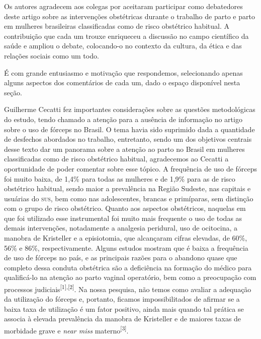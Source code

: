 \documentclass{article}
\begin{document}
Os autores agradecem aos colegas por aceitaram participar como debatedores deste
artigo
sobre as intervenções obstétricas durante o trabalho de parto e parto em
mulheres
brasileiras classificadas como de risco obstétrico habitual. A contribuição que
cada um
trouxe enriqueceu a discussão no campo científico da saúde e ampliou o debate,
colocando-o no contexto da cultura, da ética e das relações sociais como um
todo.

É com grande entusiasmo e motivação que respondemos, selecionando apenas alguns
aspectos
dos comentários de cada um, dado o espaço disponível nesta seção.

Guilherme Cecatti fez importantes considerações sobre as questões metodológicas
do
estudo, tendo chamado a atenção para a ausência de informação no artigo sobre o
uso de
fórceps no Brasil. O tema havia sido suprimido dada a quantidade de desfechos
abordados
no trabalho, entretanto, sendo um dos objetivos centrais desse texto dar um
panorama
sobre a atenção ao parto no Brasil em mulheres classificadas como de risco
obstétrico
habitual, agradecemos ao Cecatti a oportunidade de poder comentar sobre esse
tópico. A
frequência de uso de fórceps foi muito baixa, de 1,4\% para todas as mulheres e
de 1,9\%
para as de risco obstétrico habitual, sendo maior a prevalência na Região
Sudeste, nas
capitais e usuárias do \textsc{sus}, bem como nas adolescentes, brancas e primíparas, sem
distinção com o grupo de risco obstétrico. Quanto aos aspectos obstétricos,
naquelas em
que foi utilizado esse instrumental foi muito mais frequente o uso de todas as
demais
intervenções, notadamente a analgesia peridural, uso de ocitocina, a manobra de
Kristeller e a episiotomia, que alcançaram cifras elevadas, de 60\%, 56\% e
86\%,
respectivamente. Alguns estudos mostram que é baixa a frequência de uso de
fórceps no
país, e as principais razões para o abandono quase que completo dessa conduta
obstétrica
são a deficiência na formação do médico para qualificá-lo na atenção ao parto
vaginal
operatório, bem como a preocupação com processos judiciais\textsuperscript{[}\textsuperscript{1}\textsuperscript{]}\textsuperscript{,}\textsuperscript{[}\textsuperscript{2}\textsuperscript{]}. Na nossa pesquisa, não temos como avaliar a adequação da
utilização do fórceps e, portanto, ficamos impossibilitados de afirmar se a
baixa taxa
de utilização é um fator positivo, ainda mais quando tal prática se associa à
elevada
prevalência da manobra de Kristeller e de maiores taxas de morbidade grave e
\textit{near miss}
materno\textsuperscript{[}\textsuperscript{3}\textsuperscript{]}.
\end{document}
